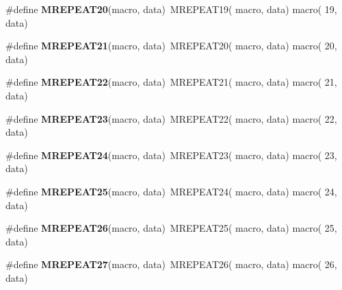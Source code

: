 \begin{DoxyCompactItemize}
\item 
\hypertarget{group__group__sam0__utils__mrepeat_ga938b8f75b8eedaadcfec2c375f7c7d2a}{}\#define {\bfseries M\+R\+E\+P\+E\+A\+T20}(macro,  data)~M\+R\+E\+P\+E\+A\+T19( macro, data)   macro( 19, data)\label{group__group__sam0__utils__mrepeat_ga938b8f75b8eedaadcfec2c375f7c7d2a}

\item 
\hypertarget{group__group__sam0__utils__mrepeat_ga7eaa38d60b2cfa155145e2d908577783}{}\#define {\bfseries M\+R\+E\+P\+E\+A\+T21}(macro,  data)~M\+R\+E\+P\+E\+A\+T20( macro, data)   macro( 20, data)\label{group__group__sam0__utils__mrepeat_ga7eaa38d60b2cfa155145e2d908577783}

\item 
\hypertarget{group__group__sam0__utils__mrepeat_ga9ac17b91b98d21f0fdbfc1f4739fe0ed}{}\#define {\bfseries M\+R\+E\+P\+E\+A\+T22}(macro,  data)~M\+R\+E\+P\+E\+A\+T21( macro, data)   macro( 21, data)\label{group__group__sam0__utils__mrepeat_ga9ac17b91b98d21f0fdbfc1f4739fe0ed}

\item 
\hypertarget{group__group__sam0__utils__mrepeat_gadd71c28e883bbbf5f033d518e35b230d}{}\#define {\bfseries M\+R\+E\+P\+E\+A\+T23}(macro,  data)~M\+R\+E\+P\+E\+A\+T22( macro, data)   macro( 22, data)\label{group__group__sam0__utils__mrepeat_gadd71c28e883bbbf5f033d518e35b230d}

\item 
\hypertarget{group__group__sam0__utils__mrepeat_gaa40f282e37901ebbaac8b42af65e02fb}{}\#define {\bfseries M\+R\+E\+P\+E\+A\+T24}(macro,  data)~M\+R\+E\+P\+E\+A\+T23( macro, data)   macro( 23, data)\label{group__group__sam0__utils__mrepeat_gaa40f282e37901ebbaac8b42af65e02fb}

\item 
\hypertarget{group__group__sam0__utils__mrepeat_ga10a7a74d8723d1fd28cdc2b0509854d2}{}\#define {\bfseries M\+R\+E\+P\+E\+A\+T25}(macro,  data)~M\+R\+E\+P\+E\+A\+T24( macro, data)   macro( 24, data)\label{group__group__sam0__utils__mrepeat_ga10a7a74d8723d1fd28cdc2b0509854d2}

\item 
\hypertarget{group__group__sam0__utils__mrepeat_ga83d8975851482186f25f70bd64384a12}{}\#define {\bfseries M\+R\+E\+P\+E\+A\+T26}(macro,  data)~M\+R\+E\+P\+E\+A\+T25( macro, data)   macro( 25, data)\label{group__group__sam0__utils__mrepeat_ga83d8975851482186f25f70bd64384a12}

\item 
\hypertarget{group__group__sam0__utils__mrepeat_gad5d25e8243cfb609c41b148d18af27ac}{}\#define {\bfseries M\+R\+E\+P\+E\+A\+T27}(macro,  data)~M\+R\+E\+P\+E\+A\+T26( macro, data)   macro( 26, data)\label{group__group__sam0__utils__mrepeat_gad5d25e8243cfb609c41b148d18af27ac}


\end{DoxyCompactItemize}
